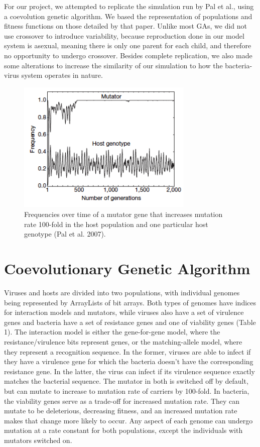\documentclass[11pt, oneside]{article}
\begin{document}
For our project, we attempted to replicate the simulation run by Pal et al., using a coevolution genetic algorithm. We based the representation of populations and fitness functions on those detailed by that paper. Unlike most GAs, we did not use crossover to introduce variability, because reproduction done in our model system is asexual, meaning there is only one parent for each child, and therefore no opportunity to undergo crossover. Besides complete replication, we also made some alterations to increase the similarity of our simulation to how the bacteria-virus system operates in nature. 

\begin{figure}[H]
	\centering
	\includegraphics[width=0.75\textwidth]{figure2.png}
	\caption{Frequencies over time of a mutator gene that increases mutation rate 100-fold in the host 			population and one particular host genotype (Pal et al. 2007).}
\end{figure}

\section{Coevolutionary Genetic Algorithm}
Viruses and hosts are divided into two populations, with individual genomes being represented by ArrayLists of bit arrays. Both types of genomes have indices for interaction models and mutators, while viruses also have a set of virulence genes and bacteria have a set of resistance genes and one of viability genes (Table 1). The interaction model is either the gene-for-gene model, where the resistance/virulence bits represent genes, or the matching-allele model, where they represent a recognition sequence. In the former, viruses are able to infect if they have a virulence gene for which the bacteria doesn't have the corresponding resistance gene. In the latter, the virus can infect if its virulence sequence exactly matches the bacterial sequence. The mutator in both is switched off by default, but can mutate to increase to mutation rate of carriers by 100-fold. In bacteria, the viability genes serve as a trade-off for increased mutation rate. They can mutate to be deleterious, decreasing fitness, and an increased mutation rate makes that change more likely to occur. Any aspect of each genome can undergo mutation at a rate constant for both populations, except the individuals with mutators switched on. 
\end{document}
